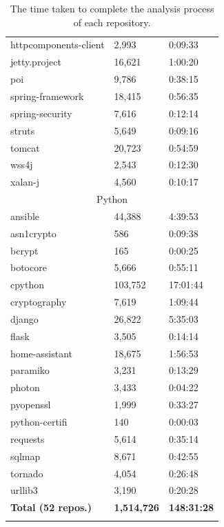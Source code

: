 \documentclass[12pt, a4paper]{report}
\begin{document}
\begin{longtable}{|l|l|l|}
    httpcomponents-client & 2,993 & 0:09:33 \\
    jetty.project & 16,621 & 1:00:20 \\
    poi & 9,786 & 0:38:15 \\
    spring-framework & 18,415 & 0:56:35 \\
    spring-security & 7,616 & 0:12:14 \\
    struts & 5,649 & 0:09:16 \\
    tomcat & 20,723 & 0:54:59 \\
    wss4j & 2,543 & 0:12:30 \\
    xalan-j & 4,560 & 0:10:17 \\ \hline
    \multicolumn{3}{|c|}{\cellcolor[HTML]{D8D8D8}Python} \\ \hline
    ansible & 44,388 & 4:39:53 \\
    asn1crypto & 586 & 0:09:38 \\
    bcrypt & 165 & 0:00:25 \\
    botocore & 5,666 & 0:55:11 \\
    cpython & 103,752 & 17:01:44 \\
    cryptography & 7,619 & 1:09:44 \\
    django & 26,822 & 5:35:03 \\
    flask & 3,505 & 0:14:14 \\
    home-assistant & 18,675 & 1:56:53 \\
    paramiko & 3,231 & 0:13:29 \\
    photon & 3,433 & 0:04:22 \\
    pyopenssl & 1,999 & 0:33:27 \\
    python-certifi & 140 & 0:00:03 \\
    requests & 5,614 & 0:35:14 \\
    sqlmap & 8,671 & 0:42:55 \\
    tornado & 4,054 & 0:26:48 \\
    urllib3 & 3,190 & 0:20:28 \\ \hline \hline
    \textbf{Total (52 repos.)} & \textbf{1,514,726} & \textbf{148:31:28} \\ \hline
    \caption{The time taken to complete the analysis process of each repository.}
    \label{table:perf_result}
  \end{longtable}
\end{document}
